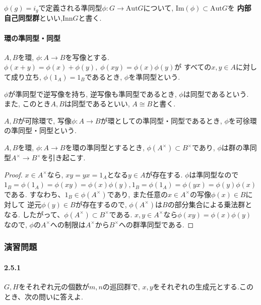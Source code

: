 \begin{dfn*}
	$\phi(g)=i_g$で定義される準同型$\phi:G\to \mathrm{Aut}G$について,
	$\mathrm{Im}(\phi) \subset \mathrm{Aut}G$を
	\textbf{内部自己同型群}といい,$\mathrm{Inn}G$と書く.	
\end{dfn*}

\paragraph{環の準同型・同型}$A,B$を環, $\phi:A\to B$を写像とする.
$\phi(x+y)=\phi(x)+\phi(y),\; \phi(xy)=\phi(x)\phi(y)$が
すべての$x,y \in A$に対して成り立ち, $\phi(1_A)=1_B$であるとき, $\phi$を準同型という.

$\phi$が準同型で逆写像を持ち, 逆写像も準同型であるとき, $\phi$は同型であるという.
また, このとき$A,B$は同型であるといい, $A\cong B$と書く.

$A,B$が可除環で, 写像$\phi:A\to B$が環としての準同型・同型であるとき,
$\phi$を可徐環の準同型・同型という.\newline

\begin{tcolorbox}
  \begin{prp*}
    $A,B$を環, $\phi:A\to B$を環の準同型とするとき,
    $\phi(A^\times)\subset B^\times$であり,
    $\phi$は群の準同型$A^\times \to B^\times$を引き起こす.
  \end{prp*}
\end{tcolorbox}
\begin{proof}
  $x \in A^\times$なら, $xy=yx=1_A$となる$y \in A$が存在する.
  $\phi$は準同型なので
  $1_B=\phi(1_A)=\phi(xy)=\phi(x)\phi(y), 1_B = \phi(1_A)=\phi(yx)=\phi(y)\phi(x)$
 である. すなわち、$1_B \in \phi(A^\times)$であり,
 また任意の$x \in A^\times$の写像$\phi(x) \in B$に対して
 逆元$\phi(y) \in B$が存在するので,
 $\phi(A^\times)$は$B$の部分集合による乗法群となる.
 したがって、$\phi(A^\times)\subset B^\times $である.
 $x,y \in A^\times$なら$\phi(xy)=\phi(x)\phi(y)$なので,
 $\phi$の$A^\times$への制限は$A^\times$から$B^\times$への群準同型である.
\end{proof}\leavevmode

\subsubsection*{演習問題}
\paragraph{2.5.1} $G,H$をそれぞれ元の個数が$m,n$の巡回群で,
$x,y$をそれぞれの生成元とする.このとき、次の問いに答えよ.

